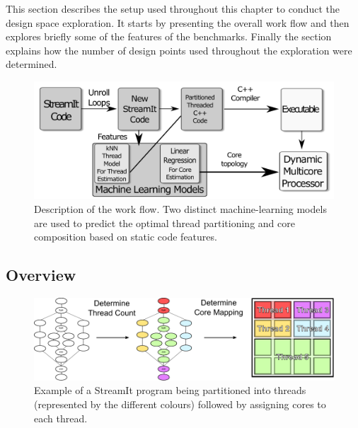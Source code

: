 This section describes the setup used throughout this chapter to conduct the design space exploration.
It starts by presenting the overall work flow and then explores briefly some of the features of the benchmarks.
Finally the section explains how the number of design points used throughout the exploration were determined.

\begin{figure}[t]
    \centering
    \includegraphics[width=1\textwidth]{streamit-paper/graphics/explanation3.pdf}
    \caption{Description of the work flow.
    Two distinct machine-learning models are used to predict the optimal thread partitioning and core composition based on static code features.}
    \label{fig:overview}
\end{figure}

\subsection{Overview}

\begin{figure}[t]
    \centering
    \includegraphics[width=1\textwidth]{streamit-paper/graphics/examplestrem.pdf}
    \caption{Example of a StreamIt program being partitioned into threads (represented by the different colours) followed by assigning cores to each thread.}
    \label{fig:examplestream}
\end{figure}

